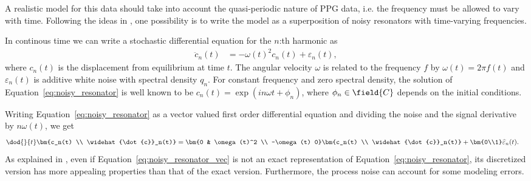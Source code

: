 A realistic model for this data 
should take into account the quasi-periodic nature of PPG data,
i.e. the frequency must be allowed to vary with time.
Following the ideas in \textcite{Sarkka2012}, one possibility
is to write the model as a superposition of noisy resonators
with time-varying frequencies.

In continous time we can write a stochastic differential equation
for the $n$:th harmonic as
\begin{align}
	 \ddot{c}_n(t)&= -\omega(t)^2c_n(t)+\varepsilon_n(t),
	\label{eq:noisy_resonator}
\end{align}
where $c_n(t)$ is the displacement from equilibrium at time $t$.
The angular velocity $\omega$ is related to the frequency $f$
by $\omega(t)=2\pi f(t)$ and  $\varepsilon_n(t)$ is additive
white noise with spectral density $q_n$. For constant frequency and
zero spectral density, the solution of Equation~\eqref{eq:noisy_resonator}
is well known to be $c_n(t)=\exp(i n \omega t+\phi_n)$, where $\phi_n\in\field{C}$ depends on 
the initial conditions.

Writing Equation~\eqref{eq:noisy_resonator} as a vector valued first order differential equation
and dividing the noise and the signal derivative by $n\omega(t)$, we get
\begin{align}
	\dod{}{t}\bm{c_n(t) \\ \widehat{\dot{c}}_n(t)} &= \bm{0 & \omega(t)^2 \\ -\omega(t) 0}\bm{c_n(t) \\
	\widehat{\dot{c}}_n(t)}+\bm{0\\1}
	\widehat{\varepsilon}_n(t).
	\label{eq:noisy_resonator_vec}
\end{align}
As explained in \textcite{Sarkka2012}, even if Equation~\eqref{eq:noisy_resonator_vec} is not an exact
representation of Equation~\eqref{eq:noisy_resonator}, its discretized version has more appealing
properties than that of the exact version. Furthermore, the process noise can account for some
modeling errors. 

